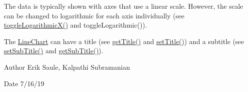 The data is typically shown with axes that use a linear scale. However, the scale can be changed to logarithmic for each axis individually (see \hyperlink{classbridges_1_1datastructure_1_1_line_chart_a4e2aa224d793793faa0c5a6edb729646}{toggle\+Logarithmic\+X()} and toggle\+Logarithmic()).

The \hyperlink{classbridges_1_1datastructure_1_1_line_chart}{Line\+Chart} can have a title (see \hyperlink{classbridges_1_1datastructure_1_1_line_chart_aa38d6cf9657d2757a98b657f079ae2bc}{get\+Title()} and \hyperlink{classbridges_1_1datastructure_1_1_line_chart_ac42cf1e6348ce8ab0c3593a496a3539c}{set\+Title()}) and a subtitle (see \hyperlink{classbridges_1_1datastructure_1_1_line_chart_a578c2590cb6baa8ef40ba1251bd1279e}{set\+Sub\+Title()} and \hyperlink{classbridges_1_1datastructure_1_1_line_chart_a07a4424d4bbc1cdd15cef3e2c0f0c075}{get\+Sub\+Title()}).

\begin{DoxyAuthor}{Author}
Erik Saule, Kalpathi Subramanian
\end{DoxyAuthor}
\begin{DoxyDate}{Date}
7/16/19 
\end{DoxyDate}
